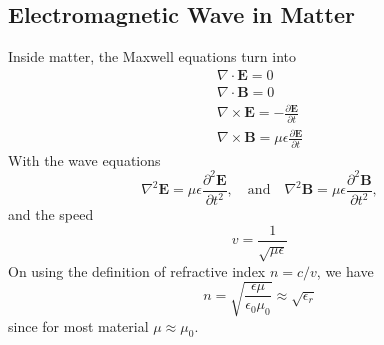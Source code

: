 \documentclass[../../../main.tex]{subfiles}
\begin{document}
\subsection{Electromagnetic Wave in Matter}
Inside matter, the Maxwell equations turn into
\begin{gather*}
    \nabla\cdot\mathbf{E}=0\\
    \nabla\cdot\mathbf{B}=0\\
    \nabla\times\mathbf{E}=-\frac{\partial \mathbf{E}}{\partial t}\\
    \nabla\times\mathbf{B}=\mu\epsilon\frac{\partial \mathbf{E}}{\partial t}
\end{gather*}
With the wave equations
\begin{equation*}
    \nabla^2\mathbf{E}=\mu\epsilon\frac{\partial^2\mathbf{E}}{\partial t^2},\quad\text{and}\quad \nabla^2\mathbf{B}=\mu\epsilon\frac{\partial^2\mathbf{B}}{\partial t^2},
\end{equation*}
and the speed
\begin{equation*}
    v=\frac{1}{\sqrt{\mu\epsilon}}
\end{equation*}
On using the definition of refractive index $n=c/v$, we have
\begin{equation*}
    n=\sqrt{\frac{\epsilon\mu}{\epsilon_0\mu_0}}\approx\sqrt{\epsilon_r}
\end{equation*}
since for most material $\mu\approx\mu_0$.
\end{document}

